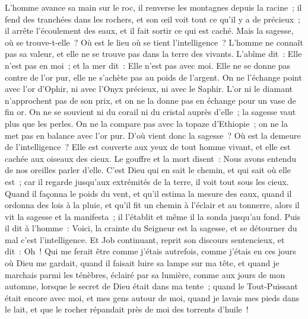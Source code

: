 \begin{multicols}{2}
L'homme avance sa main sur le roc, il renverse les montagnes depuis la racine~;
il fend des tranchées dans les rochers, et son œil voit tout ce qu'il y a de précieux~;
il arrête l'écoulement des eaux, et il fait sortir ce qui est caché.
Mais la sagesse, où se trouve-t-elle~? Où est le lieu où se tient l'intelligence~?
L'homme ne connaît pas sa valeur, et elle ne se trouve pas dans la terre des vivants.
L'abîme dit~: Elle n'est pas en moi~; et la mer dit~: Elle n'est pas avec moi.
Elle ne se donne pas contre de l'or pur, elle ne s'achète pas au poids de l'argent.
On ne l'échange point avec l'or d'Ophir, ni avec l'Onyx précieux, ni avec le Saphir.
L'or ni le diamant n'approchent pas de son prix, et on ne la donne pas en échange pour un vase de fin or.
On ne se souvient ni du corail ni du cristal auprès d'elle~; la sagesse vaut plus que les perles.
On ne la compare pas avec la topaze d'Ethiopie~; on ne la met pas en balance avec l'or pur.
D'où vient donc la sagesse~? Où est la demeure de l'intelligence~?
Elle est couverte aux yeux de tout homme vivant, et elle est cachée aux oiseaux des cieux.
Le gouffre et la mort disent~: Nous avons entendu de nos oreilles parler d'elle.
C'est Dieu qui en sait le chemin, et qui sait où elle est~;
car il regarde jusqu'aux extrémités de la terre, il voit tout sous les cieux.
Quand il façonna le poids du vent, et qu'il estima la mesure des eaux,
quand il ordonna des lois à la pluie, et qu'il fit un chemin à l'éclair et au tonnerre,
alors il vit la sagesse et la manifesta~; il l'établit et même il la sonda jusqu'au fond.
Puis il dit à l'homme~: Voici, la crainte du Seigneur est la sagesse, et se détourner du mal c'est l'intelligence.
\VerseOne{} Et Job continuant, reprit son discours sentencieux, et dit~:
Oh~! Qui me ferait être comme j'étais autrefois, comme j'étais en ces jours où Dieu me gardait,
quand il faisait luire sa lampe sur ma tête, et quand je marchais parmi les ténèbres, éclairé par sa lumière,
comme aux jours de mon automne, lorsque le secret de Dieu était dans ma tente~;
quand le Tout-Puissant était encore avec moi, et mes gens autour de moi,
quand je lavais mes pieds dans le lait, et que le rocher répandait près de moi des torrents d'huile~!

\end{multicols}
